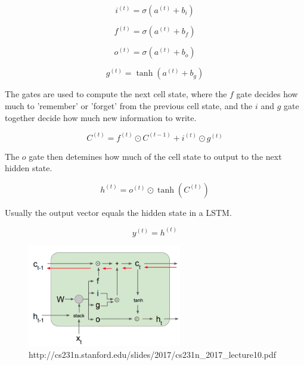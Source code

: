 \documentclass[11pt]{article}
\begin{document}
\begin{equation} i^{(t)} = \sigma(a^{(t)} + b_i) \end{equation}

\begin{equation} f^{(t)} = \sigma(a^{(t)} + b_f) \end{equation}

\begin{equation} o^{(t)} = \sigma(a^{(t)} + b_o) \end{equation}

\begin{equation} g^{(t)} = \tanh(a^{(t)} + b_g) \end{equation}

The gates are used to compute the next cell state, where the $f$ gate decides how much to 'remember' or 'forget' from the previous cell state, and the $i$ and $g$ gate together decide how much new information to write.

\begin{equation} C^{(t)} = f^{(t)} \odot C^{(t-1)} + i^{(t)} \odot g^{(t)} \end{equation}

The $o$ gate then detemines how much of the cell state to output to the next hidden state.

\begin{equation} h^{(t)} = o^{(t)} \odot \tanh(C^{(t)}) \end{equation}

Usually the output vector equals the hidden state in a LSTM.

\begin{equation} y^{(t)} = h^{(t)} \end{equation}

\begin{figure}[h]
\centering
\includegraphics[width=0.6\textwidth]{lstm_diagram.png}
\caption{http://cs231n.stanford.edu/slides/2017/cs231n\_2017\_lecture10.pdf}
\end{figure}
\end{document}
